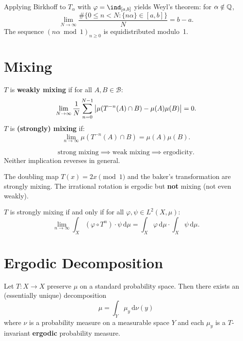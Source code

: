 \begin{example}
Applying Birkhoff to $T_\alpha$ with $\varphi = \ind_{[a,b]}$ yields Weyl's
theorem: for $\alpha \notin \mathbb{Q}$,
\[
    \lim_{N \to \infty}
    \frac{\#\{0 \leq n < N : \{n\alpha\} \in [a,b]\}}{N} = b - a.
\]
The sequence $(n\alpha \bmod 1)_{n \geq 0}$ is equidistributed modulo~1.
\end{example}

\section{Mixing}

\begin{definition}
$T$ is \textbf{weakly mixing} if for all $A, B \in \mathcal{B}$:
\[
    \lim_{N \to \infty} \frac{1}{N} \sum_{n=0}^{N-1}
    \left| \mu(T^{-n}(A) \cap B) - \mu(A)\mu(B) \right| = 0.
\]
$T$ is \textbf{(strongly) mixing} if:
\[
    \lim_{n \to \infty} \mu(T^{-n}(A) \cap B) = \mu(A)\mu(B).
\]
\end{definition}

\begin{proposition}[Implications]
\[
    \text{strong mixing} \implies \text{weak mixing} \implies \text{ergodicity}.
\]
Neither implication reverses in general.
\end{proposition}

\begin{example}
The doubling map $T(x) = 2x \pmod{1}$ and the baker's transformation are
strongly mixing. The irrational rotation is ergodic but \textbf{not} mixing
(not even weakly).
\end{example}

\begin{theorem}
$T$ is strongly mixing if and only if for all
$\varphi, \psi \in L^2(X, \mu)$:
\[
    \lim_{n \to \infty} \int_X (\varphi \circ T^n) \cdot \psi\,\mathrm{d}\mu
    = \int_X \varphi\,\mathrm{d}\mu \cdot \int_X \psi\,\mathrm{d}\mu.
\]
\end{theorem}

\section{Ergodic Decomposition}

\begin{theorem}
Let $T : X \to X$ preserve $\mu$ on a standard probability space. Then there
exists an (essentially unique) decomposition
\[
    \mu = \int_Y \mu_y\,\mathrm{d}\nu(y)
\]
where $\nu$ is a probability measure on a measurable space $Y$ and each
$\mu_y$ is a $T$-invariant \textbf{ergodic} probability measure.
\end{theorem}

